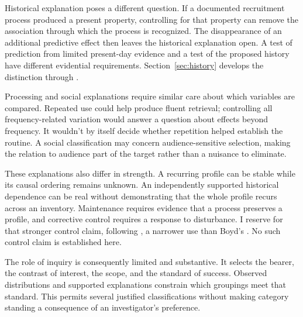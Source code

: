 Historical explanation poses a different question. If a documented
recruitment process produced a present property, controlling for that
property can remove the association through which the process is recognized.
The disappearance of an additional predictive effect then leaves the
historical explanation open. A test of prediction from limited present-day
evidence and a test of the proposed history have different evidential
requirements. Section~\ref{sec:history} develops the distinction through
.

Processing and social explanations require similar care about which
variables are compared. Repeated use could help produce fluent retrieval;
controlling all frequency-related variation would answer a question about
effects beyond frequency. It wouldn't by itself decide whether repetition
helped establish the routine. A social classification may concern
audience-sensitive selection, making the relation to audience part of the
target rather than a nuisance to eliminate.

These explanations also differ in strength. A recurring profile can be
stable while its causal ordering remains unknown. An independently
supported historical dependence can be real without demonstrating that
the whole profile recurs across an inventory. Maintenance requires evidence
that a process preserves a profile, and corrective control requires a
response to disturbance. I reserve  for that stronger
control claim, following \textcite{reynolds2026notEveryStableCluster}, a
narrower use than Boyd's \citep[143]{boyd1999}. No such control claim is
established here.

The role of inquiry is consequently limited and substantive. It selects
the bearer, the contrast of interest, the scope, and the standard of success.
Observed distributions and supported explanations constrain which groupings
meet that standard. This permits several justified classifications without
making category standing a consequence of an investigator's preference.
